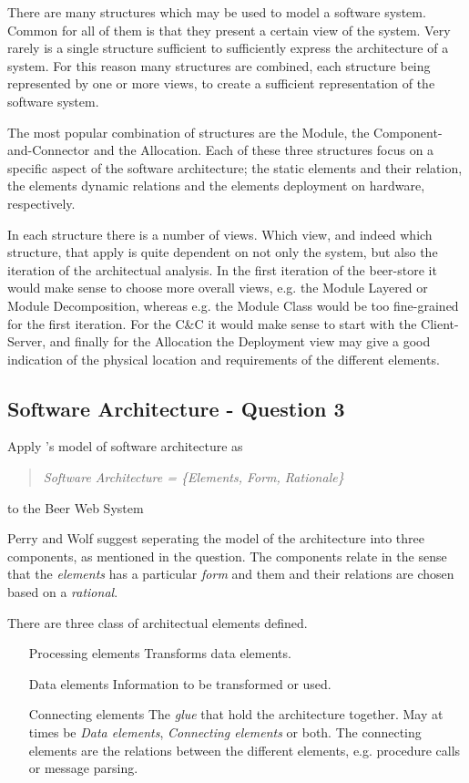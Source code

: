 There are many structures which may be used to model a software system. Common for all of them is that they present a certain view of the system. Very rarely is a single structure sufficient to sufficiently express the architecture of a system. For this reason many structures are combined, each structure being represented by one or more views, to create a sufficient representation of the software system.

The most popular combination of structures are the Module, the Component-and-Connector and the Allocation. Each of these three structures focus on a specific aspect of the software architecture; the static elements and their relation, the elements dynamic relations and the elements deployment on hardware, respectively. 

In each structure there is a number of views. Which view, and indeed which structure, that apply is quite dependent on not only the system, but also the iteration of the architectual analysis. In the first iteration of the beer-store it would make sense to choose more overall views, e.g. the Module Layered or Module Decomposition, whereas e.g. the Module Class would be too fine-grained for the first iteration. For the C\&C it would make sense to start with the Client-Server, and finally for the Allocation the Deployment view may give a good indication of the physical location and requirements of the different elements.

\subsection{Software Architecture - Question 3}

\begin{question}
Apply \cite{perrywolf1992}'s model of software architecture as
\begin{quote}
	{\it Software Architecture = \{Elements, Form, Rationale\}}
\end{quote}
to the Beer Web System
\end{question}

Perry and Wolf suggest seperating the model of the architecture into three components, as mentioned in the question. The components relate in the sense that the \emph{elements} has a particular \emph{form} and them and their relations are chosen based on a \emph{rational}.

There are three class of architectual elements defined.
\begin{itemize}
    \item[Processing elements] Transforms data elements.
    \item[Data elements] Information to be transformed or used.
    \item[Connecting elements] The \emph{glue} that hold the architecture together. May at times be \emph{Data elements}, \emph{Connecting elements} or both. The connecting elements are the relations between the different elements, e.g. procedure calls or message parsing.
\end{itemize}

